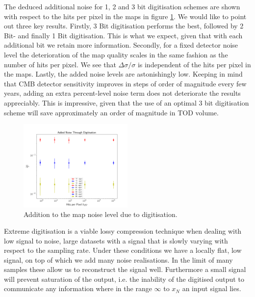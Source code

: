 \documentclass[apj]{emulateapj}
\begin{document}
The deduced additional noise for 1, 2 and 3 bit digitisation schemes are shown with respect to the hits per pixel in the maps in figure \ref{fig:extranoise}. We would like to point out three key results. Firstly, 3 Bit digitisation performs the best, followed by 2 Bit- and finally 1 Bit digitisation. This is what we expect, given that with each additional bit we retain more information. Secondly, for a fixed detector noise level the deterioration of the map quality scales in the same fashion as the number of hits per pixel. We see that $\Delta \sigma / \sigma$ is independent of the hits per pixel in the maps. Lastly, the added noise levels are astonishingly low. Keeping in mind that CMB detector sensitivity improves in steps of order of magnitude every few years, adding an extra percent-level noise term does not deteriorate the results appreciably. This is impressive, given that the use of an optimal 3 bit digitisation scheme will save approximately an order of magnitude in TOD volume.

\begin{figure}[htb]\centering
\includegraphics[width=0.5\textwidth,clip]{Plots/addednoise.png}
  \caption[Current ]{
  Addition to the map noise level due to digitisation. 
           \label{fig:extranoise}
  }
\end{figure}

Extreme digitisation is a viable lossy compression technique when dealing with low signal to noise, large datasets with a signal that is slowly varying with respect to the sampling rate. Under these conditions we have a locally flat, low signal, on top of which we add many noise realisations. In the limit of many samples these allow us to reconstruct the signal well. Furthermore a small signal will prevent saturation of the output, i.e. the inability of the digitised output to communicate any information where in the range $\infty$ to $x_N$ an input signal lies.
\end{document}
